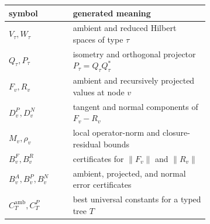 \begin{tabular}{@{}lp{0.68\linewidth}@{}}
\toprule
symbol & generated meaning \\
\midrule
$V_\tau,W_\tau$ & ambient and reduced Hilbert spaces of type $\tau$ \\
$Q_\tau,P_\tau$ & isometry and orthogonal projector $P_\tau=Q_\tau Q_\tau^*$ \\
$F_v,R_v$ & ambient and recursively projected values at node $v$ \\
$D_v^P,D_v^N$ & tangent and normal components of $F_v-R_v$ \\
$M_v,\rho_v$ & local operator-norm and closure-residual bounds \\
$B_v^F,B_v^R$ & certificates for $\lVert F_v\rVert$ and $\lVert R_v\rVert$ \\
$B_v^A,B_v^P,B_v^N$ & ambient, projected, and normal error certificates \\
$C_T^{\mathrm{amb}},C_T^P$ & best universal constants for a typed tree $T$ \\
\bottomrule
\end{tabular}

